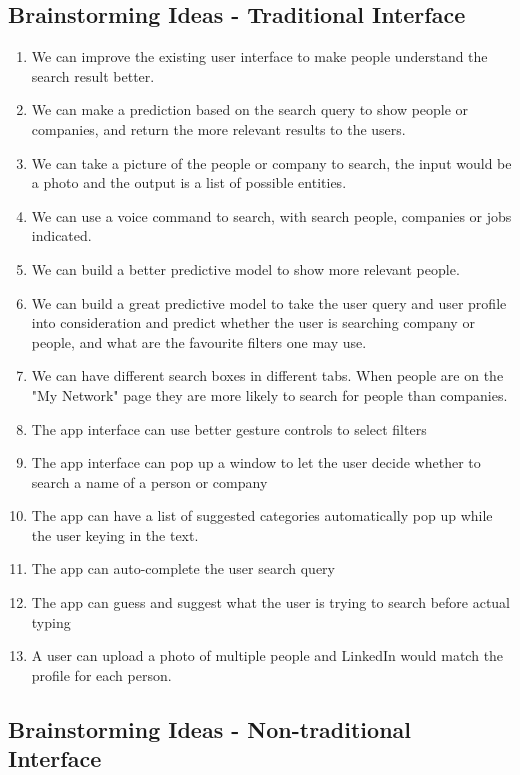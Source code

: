 \documentclass[
	letterpaper, %
]{jdf}
\begin{document}
\subsection{Brainstorming Ideas - Traditional Interface}

\begin{enumerate}
    \item We can improve the existing user interface to make people understand the search result better.
    \item We can make a prediction based on the search query to show people or companies, and return the more relevant results to the users.
    \item We can take a picture of the people or company to search, the input would be a photo and the output is a list of possible entities.
    \item We can use a voice command to search, with search people, companies or jobs indicated.
    \item We can build a better predictive model to show more relevant people.
    \item We can build a great predictive model to take the user query and user profile into consideration and predict whether the user is searching company or people, and what are the favourite filters one may use.
    \item We can have different search boxes in different tabs. When people are on the "My Network" page they are more likely to search for people than companies.
    \item The app interface can use better gesture controls to select filters
    \item The app interface can pop up a window to let the user decide whether to search a name of a person or company
    \item The app can have a list of suggested categories automatically pop up while the user keying in the text.
    \item The app can auto-complete the user search query
    \item The app can guess and suggest what the user is trying to search before actual typing
    \item A user can upload a photo of multiple people and LinkedIn would match the profile for each person.
\end{enumerate}

\subsection{Brainstorming Ideas - Non-traditional Interface}
\end{document}
